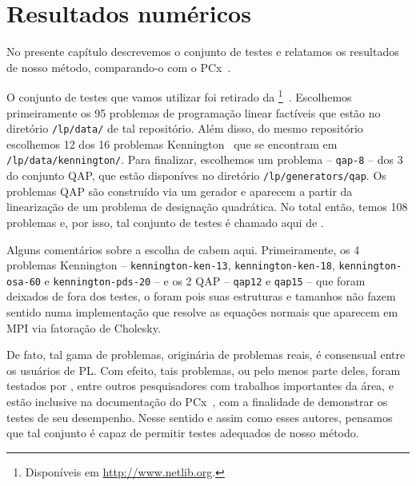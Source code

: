 

\chapter{Resultados numéricos}
\label{chap:numerical}



No presente capítulo descrevemos o conjunto de testes e relatamos os resultados de nosso método, comparando-o com o  PCx~\cite{Czyzyk:1999hk}.




O conjunto de testes que vamos utilizar foi retirado da \Netlib\footnote{Disponíveis em \url{http://www.netlib.org}.}~\cite{Dongarra:1987jk}. Escolhemos primeiramente os \num{95} problemas de programação linear factíveis que estão no diretório \verb|/lp/data/| de tal repositório.  Além disso, do mesmo repositório escolhemos \num{12} dos \num{16} problemas Kennington~\cite{Kennington:1990vo} que se encontram em \verb|/lp/data/kennington/|. Para finalizar, escolhemos um problema -- \texttt{qap-8} -- dos \num{3} do conjunto  QAP, que estão disponíves no diretório \verb|/lp/generators/qap|. Os problemas QAP são  construído via um gerador  e  aparecem a partir da linearização de um problema  de designação quadrática. No total então, temos 108 problemas e, por isso, tal conjunto de testes é chamado aqui de . 

Alguns comentários sobre a escolha de  cabem aqui. Primeiramente, os \num{4} problemas  Kennington -- \texttt{kennington-ken-13}, \texttt{kennington-ken-18}, \texttt{ken\-ning\-ton-osa-60} e \texttt{ken\-ning\-ton-pds-20} --  e os \num{2} QAP -- \texttt{qap12} e \texttt{qap15} --  que foram deixados de fora dos testes, o foram pois suas estruturas e tamanhos não fazem sentido numa implementação que resolve as equações normais que aparecem em \ac{MPI} via fatoração de Cholesky. 

De fato, tal gama de problemas, originária de problemas reais,  é consensual entre os usuários de \ac{PL}. Com efeito, tais problemas, ou pelo menos parte deles, foram testados por \textcite{Mehrotra:1992wr,Colombo:2008ia,Mehrotra:2005do,Jarre:1999tl,Gondzio:1996uw}, entre outros pesquisadores com trabalhos importantes da área, e estão inclusive na documentação do PCx~\cite{Czyzyk:1998vw,Czyzyk:1999hk}, com a finalidade de demonstrar os testes de seu desempenho. Nesse sentido e assim como esses autores, pensamos que tal conjunto é capaz de permitir testes adequados de nosso método. 


